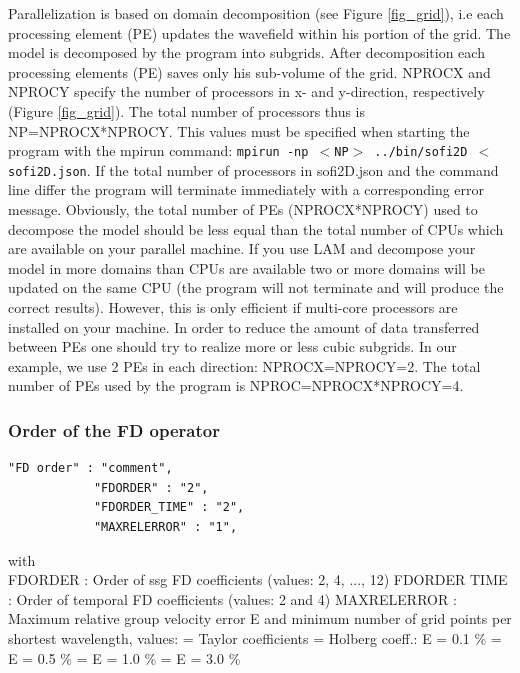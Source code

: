 \documentclass[11pt,onecolumn,oneside]{article}
\begin{document}
Parallelization is based on domain decomposition (see Figure \ref{fig_grid}), i.e each processing element (PE) updates the wavefield within his portion of the grid. The model is  decomposed by the program into subgrids. After decomposition each processing elements (PE) saves only his sub-volume of the grid. NPROCX and NPROCY specify the number of processors in x- and y-direction, respectively (Figure  \ref{fig_grid}). The total number of processors thus is NP=NPROCX*NPROCY. This values must be specified when starting the program with the mpirun command: \texttt{mpirun -np $<$NP$>$ ../bin/sofi2D $<$ sofi2D.json}. If the total number of processors in sofi2D.json and the command line differ the program will terminate immediately with a corresponding error message. Obviously, the total number of PEs (NPROCX*NPROCY) used to decompose the model should be less equal than the total number of CPUs which are available on your parallel machine. If you use LAM and decompose your model in more
domains than CPUs are available two or more  domains will be updated on the same CPU (the program will not terminate and will produce the correct results). However, this is only efficient if multi-core processors are installed on your machine. In order to reduce the amount of data transferred between PEs one should try to realize more or less cubic subgrids. In our example, we use 2 PEs in each direction: NPROCX=NPROCY=2. The total number of PEs used by the program is NPROC=NPROCX*NPROCY=4. 

\subsubsection{Order of the FD operator}
\begin{verbatim}
"FD order" : "comment",
			"FDORDER" : "2",
			"FDORDER_TIME" : "2",
			"MAXRELERROR" : "1",
\end{verbatim}

with \\ 
FDORDER : Order of ssg FD coefficients (values: 2, 4, ..., 12)\newline
FDORDER TIME : Order of temporal FD coefficients (values: 2 and 4)\newline
MAXRELERROR : Maximum relative group velocity error E and minimum number of grid points per shortest wavelength, values: = Taylor coefficients = Holberg coeff.: E = 0.1 \%  =                 E = 0.5 \%  =                 E = 1.0 \%  =                 E = 3.0 \% \newline
\end{document}
